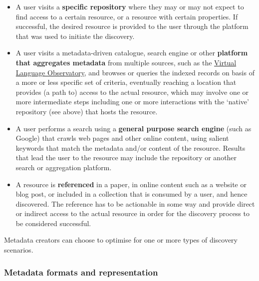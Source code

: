 \begin{itemize}
\tightlist
\item
  A user visits a \textbf{specific repository} where they may or may not
  expect to find access to a certain resource, or a resource with
  certain properties. If successful, the desired resource is provided to
  the user through the platform that was used to initiate the discovery.
\item
  A user visits a metadata-driven catalogue, search engine or other
  \textbf{platform that aggregates metadata} from multiple sources, such
  as the \href{https://www.clarin.eu/vlo}{Virtual Language Observatory},
  and browses or queries the indexed records on basis of a more or less
  specific set of criteria, eventually reaching a location that provides
  (a path to) access to the actual resource, which may involve one or
  more intermediate steps including one or more interactions with the
  `native' repository (see above) that hosts the resource.
\item
  A user performs a search using a \textbf{general purpose search
  engine} (such as Google) that crawls web pages and other online
  content, using salient keywords that match the metadata and/or content
  of the resource. Results that lead the user to the resource may
  include the repository or another search or aggregation platform.
\item
  A resource is \textbf{referenced} in a paper, in online content such
  as a website or blog post, or included in a collection that is
  consumed by a user, and hence discovered. The reference has to be
  actionable in some way and provide direct or indirect access to the
  actual resource in order for the discovery process to be considered
  successful.
\end{itemize}

Metadata creators can choose to optimise for one or more types of
discovery scenarios.

\subsubsection{Metadata formats and
representation}\label{metadata-formats-and-representation}

